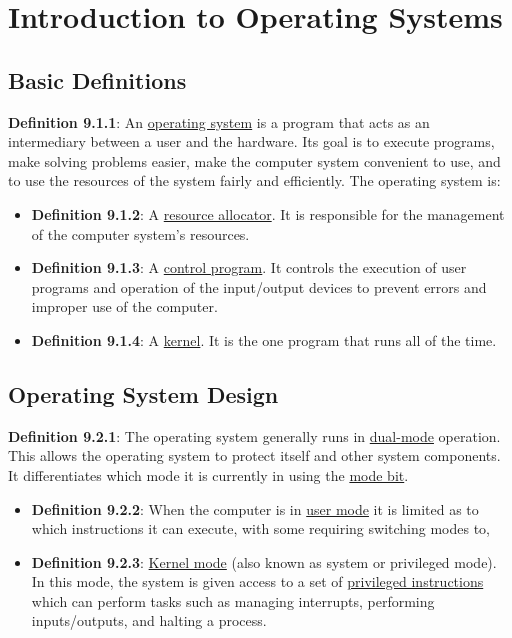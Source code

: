 \documentclass{article}
\newcommand{\separate}[1] {\vspace{#1 pt}\noindent}
\newcommand{\definition}[2]{\textbf{Definition #1}: #2\label{def:#1}}
\begin{document}
\section{Introduction to Operating Systems}

\subsection{Basic Definitions}

\definition{9.1.1}{An \underline{operating system} is a program that acts as an intermediary between a user and the hardware. Its goal is to execute programs, make solving problems easier, make the computer system convenient to use, and to use the resources of the system fairly and efficiently. The operating system is:}
\begin{itemize}
    \item \definition{9.1.2}{A \underline{resource allocator}. It is responsible for the management of the computer system's resources.}
    \item \definition{9.1.3}{A \underline{control program}. It controls the execution of user programs and operation of the input/output devices to prevent errors and improper use of the computer.}
    \item \definition{9.1.4}{A \underline{kernel}. It is the one program that runs all of the time.}
\end{itemize}

\subsection{Operating System Design}

\separate{5}\definition{9.2.1}{The operating system generally runs in \underline{dual-mode} operation. This allows the operating system to protect itself and other system components. It differentiates which mode it is currently in using the \underline{mode bit}.}
\begin{itemize}
    \item \definition{9.2.2}{When the computer is in \underline{user mode} it is limited as to which instructions it can execute, with some requiring switching modes to,}
    \item \definition{9.2.3}{\underline{Kernel mode} (also known as system or privileged mode). In this mode, the system is given access to a set of \underline{privileged instructions} which can perform tasks such as managing interrupts, performing inputs/outputs, and halting a process.}
\end{itemize}
\end{document}
